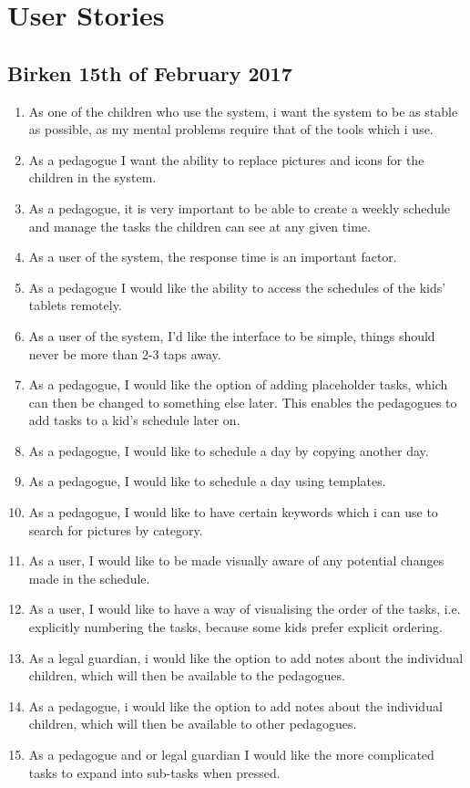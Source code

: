 \chapter{User Stories}
\section{Birken 15th of February 2017}\label{BirkenUserStories1502}
\begin{enumerate}
  \setlength\itemsep{0em}
  \item As one of the children who use the system, i want the system to be as
  stable as possible, as my mental problems require that of the tools which i use.
  \item As a pedagogue I want the ability to replace pictures and icons for the children in the system.
  \item As a pedagogue, it is very important to be able to create a weekly
  schedule and manage the tasks the children can see at any given time.
  \item As a user of the system, the response time is an important factor.
  \item As a pedagogue I would like the ability to access the schedules of the kids’ tablets remotely.
  \item As a user of the system, I’d like the interface to be simple, things should never be more than 2-3 taps away.
  \item As a pedagogue, I would like the option of adding placeholder tasks, which can then be changed to something else later. This enables the pedagogues to add tasks to a kid’s schedule later on.
  \item As a pedagogue, I would like to schedule a day by copying another day.
  \item As a pedagogue, I would like to schedule a day using templates.
  \item As a pedagogue, I would like to have certain keywords which i can use to search for pictures by category.
  \item As a user, I would like to be made visually aware of any potential changes made in the schedule.
  \item As a user, I would like to have a way of visualising the order of the tasks, i.e. explicitly numbering the tasks, because some kids prefer explicit ordering.
  \item As a legal guardian, i would like the option to add notes about the individual children, which will then be available to the pedagogues.
  \item As a pedagogue, i would like the option to add notes about the individual children, which will then be available to other pedagogues.
  \item As a pedagogue and or legal guardian I would like the more complicated tasks to expand into sub-tasks when pressed.
\end{enumerate}

